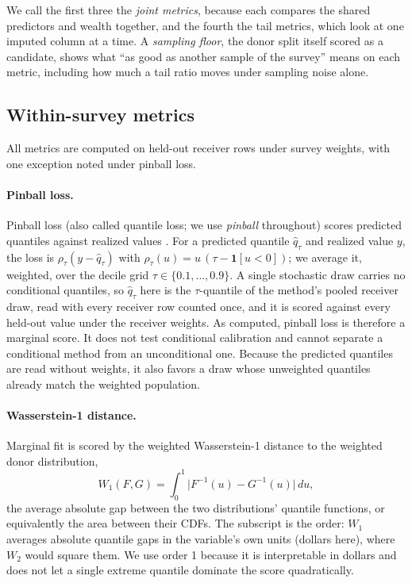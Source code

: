 We call the first three the \emph{joint metrics}, because each compares the
shared predictors and wealth together, and the fourth the tail metrics,
which look at one imputed column at a time. A \emph{sampling floor}, the
donor split itself scored as a candidate, shows what ``as good as another
sample of the survey'' means on each metric, including how much a tail ratio
moves under sampling noise alone.

\subsection{Within-survey metrics}
\label{sec:metrics}

All metrics are computed on held-out receiver rows under survey weights,
with one exception noted under pinball loss.

\paragraph{Pinball loss.} Pinball loss (also called quantile loss; we use
\emph{pinball} throughout) scores predicted quantiles against realized
values \citep{koenker2005quantile}.
For a predicted quantile $\hat{q}_\tau$ and realized value $y$, the
loss is $\rho_\tau(y - \hat{q}_\tau)$ with
$\rho_\tau(u) = u\,(\tau - \mathbf{1}[u < 0])$; we average it, weighted,
over the decile grid $\tau \in \{0.1, \ldots, 0.9\}$. A single stochastic
draw carries no conditional quantiles, so $\hat{q}_\tau$ here is the
$\tau$-quantile of the method's pooled receiver draw, read with every
receiver row counted once, and it is scored against every held-out value
under the receiver weights. As computed, pinball loss is therefore a
marginal score. It does not test conditional calibration and cannot
separate a conditional method from an unconditional one. Because the
predicted quantiles are read without weights, it also favors a draw whose
unweighted quantiles already match the weighted population.

\paragraph{Wasserstein-1 distance.} Marginal fit is scored by the weighted
Wasserstein-1 distance to the weighted donor distribution,
\begin{equation}
W_1(F, G) = \int_0^1 \bigl| F^{-1}(u) - G^{-1}(u) \bigr|\, du ,
\label{eq:w1}
\end{equation}
the average absolute gap between the two distributions' quantile functions,
or equivalently the area between their CDFs. The subscript is the order:
$W_1$ averages absolute quantile gaps in the variable's own units (dollars
here), where $W_2$ would square them. We use order 1 because it is
interpretable in dollars and does not let a single extreme quantile
dominate the score quadratically.

